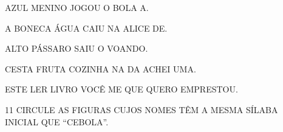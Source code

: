 \begin{escolha}
\item \LARGE{AZUL MENINO JOGOU O BOLA A.}


\item \LARGE{A BONECA ÁGUA CAIU NA ALICE DE.}


\item \LARGE{ALTO PÁSSARO SAIU O VOANDO.}


\item \LARGE{CESTA FRUTA COZINHA NA DA ACHEI UMA.}


\item \LARGE{ESTE LER LIVRO VOCÊ ME QUE QUERO EMPRESTOU.}

\end{escolha}

\num{11} CIRCULE AS FIGURAS CUJOS NOMES TÊM
A MESMA SÍLABA INICIAL QUE ``CEBOLA''.



